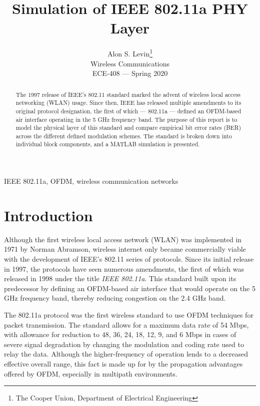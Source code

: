 \documentclass[journal]{IEEEtran}
\begin{document}
\title{Simulation of IEEE 802.11a PHY Layer}
\author{Alon S. Levin\thanks{The Cooper Union, Department of Electrical Engineering}\\Wireless Communications\\ECE-408 --- Spring 2020}
\maketitle

\begin{abstract}
The 1997 release of IEEE's 802.11 standard marked the advent of wireless local access networking (WLAN) usage. Since then, IEEE has released multiple amendments to its original protocol designation, the first of which --- 802.11a --- defined an OFDM-based air interface operating in the 5 GHz frequency band. The purpose of this report is to model the physical layer of this standard and compare empirical bit error rates (BER) across the different defined modulation schemes. The standard is broken down into individual block components, and a MATLAB simulation is presented.
\end{abstract}

\begin{IEEEkeywords}
IEEE 802.11a, OFDM, wireless communication networks
\end{IEEEkeywords}

\section{Introduction}\label{sec:intro}
Although the first wireless local access network (WLAN) was implemented in 1971 by Norman Abramson, wireless internet only became commercially viable with the development of IEEE's 802.11 series of protocols. Since its initial release in 1997, the protocols have seen numerous amendments, the first of which was released in 1998 under the title \emph{IEEE 802.11a}. This standard built upon its predecessor by defining an OFDM-based air interface that would operate on the 5 GHz frequency band, thereby reducing congestion on the 2.4 GHz band.

The 802.11a protocol was the first wireless standard to use OFDM techniques for packet transmission. The standard allows for a maximum data rate of 54 Mbps, with allowance for reduction to 48, 36, 24, 18, 12, 9, and 6 Mbps in cases of severe signal degradation by changing the modulation and coding rate used to relay the data. Although the higher-frequency of operation lends to a decreased effective overall range, this fact is made up for by the propagation advantages offered by OFDM, especially in multipath environments.
\end{document}
